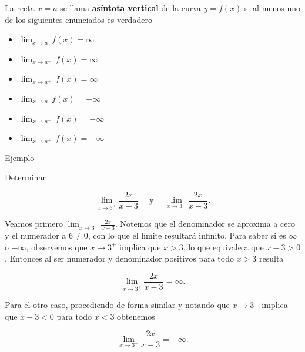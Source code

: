 \documentclass[
  letterpaper,
]{book}
\providecommand{\tightlist}{%
  \setlength{\itemsep}{0pt}\setlength{\parskip}{0pt}}
\theoremstyle{plain}
\theoremstyle{remark}
\begin{document}
\begin{tcolorbox}[enhanced jigsaw, opacityback=0, left=2mm, opacitybacktitle=0.6, toprule=.15mm, bottomrule=.15mm, colbacktitle=quarto-callout-note-color!10!white, titlerule=0mm, bottomtitle=1mm, title=\textcolor{quarto-callout-note-color}{\faInfo}\hspace{0.5em}{Definición (Asíntota vertical)}, toptitle=1mm, colframe=quarto-callout-note-color-frame, colback=white, breakable, rightrule=.15mm, arc=.35mm, leftrule=.75mm, coltitle=black]

La recta \(x=a\) se llama \textbf{asíntota vertical} de la curva
\(y=f(x)\) si al menos uno de los siguientes enunciados es verdadero

\begin{itemize}
\tightlist
\item
  \(\lim_{x\to a}\,f(x)=\infty\)
\item
  \(\lim_{x\to a^-}\,f(x)=\infty\)
\item
  \(\lim_{x\to a^+}\,f(x)=\infty\)
\end{itemize}

\begin{itemize}
\tightlist
\item
  \(\lim_{x\to a}\,f(x)=-\infty\)
\item
  \(\lim_{x\to a^-}\,f(x)=-\infty\)
\item
  \(\lim_{x\to a^+}\,f(x)=-\infty\)
\end{itemize}

\end{tcolorbox}

Ejemplo

Determinar

\[
\lim_{x\to 3^+} \frac{2x}{x-3} \quad \text{ y } \quad  \lim_{x\to 3^-} \frac{2x}{x-3}.
\]

\begin{tcolorbox}[enhanced jigsaw, opacityback=0, left=2mm, opacitybacktitle=0.6, toprule=.15mm, bottomrule=.15mm, colbacktitle=quarto-callout-tip-color!10!white, titlerule=0mm, bottomtitle=1mm, title=\textcolor{quarto-callout-tip-color}{\faLightbulb}\hspace{0.5em}{Solución}, toptitle=1mm, colframe=quarto-callout-tip-color-frame, colback=white, breakable, rightrule=.15mm, arc=.35mm, leftrule=.75mm, coltitle=black]

Veamos primero \(\lim_{x\to 3^+} \frac{2x}{x-3}\). Notemos que el
denominador se aproxima a cero y el numerador a \(6\neq 0\), con lo que
el límite resultará infinito. Para saber si es \(\infty\) o \(-\infty\),
observemos que \(x\to 3^+\) implica que \(x>3\), lo que equivale a que
\(x-3>0\). Entonces al ser numerador y denominador positivos para todo
\(x>3\) resulta

\[
\lim_{x\to 3^+} \frac{2x}{x-3}=\infty.
\]

Para el otro caso, procediendo de forma similar y notando que
\(x\to 3^-\) implica que \(x-3<0\) para todo \(x<3\) obtenemos

\[
\lim_{x\to 3^-} \frac{2x}{x-3}=-\infty.
\]

\end{tcolorbox}
\end{document}
